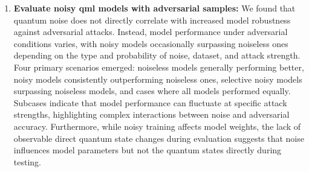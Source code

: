 \begin{enumerate}
    \item \textbf{Evaluate noisy \ac{qml} models with adversarial samples:}
        We found that quantum noise does not directly correlate with increased model
        robustness against adversarial attacks. Instead, model performance under
        adversarial conditions varies, with noisy models occasionally surpassing
        noiseless ones depending on the type and probability of noise, dataset,
        and attack strength. Four primary scenarios emerged: noiseless models
        generally performing better, noisy models consistently outperforming
        noiseless ones, selective noisy models surpassing noiseless models,
        and cases where all models performed equally. Subcases indicate that
        model performance can fluctuate at specific attack strengths, highlighting
        complex interactions between noise and adversarial accuracy. Furthermore,
        while noisy training affects model weights, the lack of observable direct
        quantum state changes during evaluation suggests that noise influences model
        parameters but not the quantum states directly during testing. \
\end{enumerate}